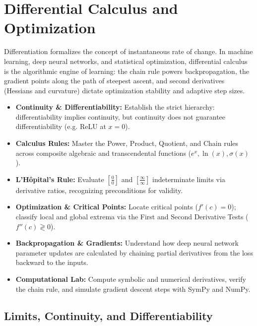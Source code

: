 \chapter{Differential Calculus and Optimization}

Differentiation formalizes the concept of instantaneous rate of change. In machine learning, deep neural networks, and statistical optimization, differential calculus is the algorithmic engine of learning: the chain rule powers backpropagation, the gradient points along the path of steepest ascent, and second derivatives (Hessians and curvature) dictate optimization stability and adaptive step sizes.

\vspace{0.3cm}
\begin{tcolorbox}[colback=primarylight, colframe=primarydark, title={\textbf{Executive Roadmap \& Learning Objectives}}]
\begin{itemize}
    \item \textbf{Continuity \& Differentiability:} Establish the strict hierarchy: differentiability implies continuity, but continuity does not guarantee differentiability (e.g. ReLU at $x=0$).
    \item \textbf{Calculus Rules:} Master the Power, Product, Quotient, and Chain rules across composite algebraic and transcendental functions ($e^x, \ln(x), \sigma(x)$).
    \item \textbf{L'Hôpital's Rule:} Evaluate $\left[\frac{0}{0}\right]$ and $\left[\frac{\infty}{\infty}\right]$ indeterminate limits via derivative ratios, recognizing preconditions for validity.
    \item \textbf{Optimization \& Critical Points:} Locate critical points ($f'(c) = 0$); classify local and global extrema via the First and Second Derivative Tests ($f''(c) \gtrless 0$).
    \item \textbf{Backpropagation \& Gradients:} Understand how deep neural network parameter updates are calculated by chaining partial derivatives from the loss backward to the inputs.
    \item \textbf{Computational Lab:} Compute symbolic and numerical derivatives, verify the chain rule, and simulate gradient descent steps with SymPy and NumPy.
\end{itemize}
\end{tcolorbox}
\vspace{0.3cm}

\section{Limits, Continuity, and Differentiability}

